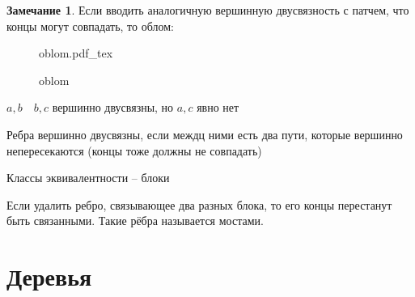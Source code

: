 \documentclass{book}
\theoremstyle{definition}
\newtheorem*{note}{Замечание}
\newcommand{\incfig}[1]{%
    \def\svgwidth{\columnwidth}
    {#1.pdf_tex}
}
\begin{document}
    \begin{note}
        Если вводить аналогичную вершинную двусвязность с патчем, что концы могут совпадать, то облом:

\begin{figure}[!ht]
    \centering
    \incfig{oblom}
    \caption{oblom}
    \label{fig:oblom}
\end{figure}

$a, b\quad b, c$ вершинно двусвязны, но  $a, c$ явно нет
    \end{note}

    \begin{definition}
        Ребра вершинно двусвязны, если междц ними есть два пути, которые вершинно непересекаются (концы тоже должны не совпадать)

        Классы эквивалентности -- блоки

        Если удалить ребро, связывающее два разных блока, то его концы перестанут быть связанными. Такие рёбра называется мостами.
    \end{definition}

    \section{Деревья}
\end{document}
